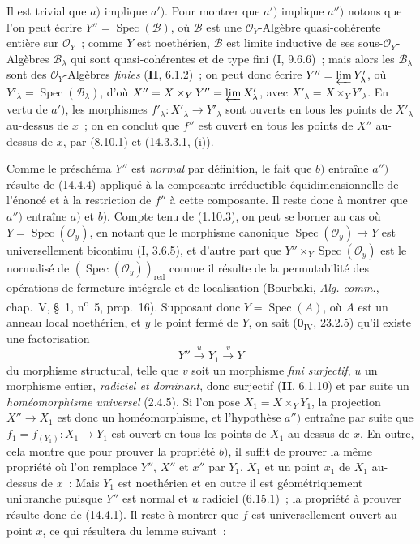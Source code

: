 Il est trivial que $a)$ implique $a')$. Pour montrer que $a')$ implique $a'')$
notons que l'on peut écrire $Y''=\operatorname{Spec}(\mathcal B)$, où $\mathcal B$
est une $\mathcal O_Y$-Algèbre quasi-cohérente entière sur $\mathcal O_Y$~; comme
$Y$ est noethérien, $\mathcal B$ est limite inductive de ses sous-$\mathcal O_Y$-
Algèbres $\mathcal B_\lambda$ qui sont quasi-cohérentes et de type fini (I, 9.6.6)~;
mais alors les $\mathcal B_\lambda$ sont des $\mathcal O_Y$-Algèbres \emph{finies}
(\textbf{II}, 6.1.2)~; on peut donc écrire
$Y''=\varprojlim Y'_\lambda$, où
$Y'_\lambda=\operatorname{Spec}(\mathcal B_\lambda)$, d'où
$X''=X\times_Y Y''=\varprojlim X'_\lambda$, avec
$X'_\lambda=X\times_Y Y'_\lambda$. En vertu de $a')$, les morphismes
$f'_\lambda:X'_\lambda\to Y'_\lambda$ sont ouverts en tous les points de
$X'_\lambda$ au-dessus de $x$~; on en conclut que $f''$ est ouvert en tous les
points de $X''$ au-dessus de $x$, par (8.10.1) et (14.3.3.1, (i)).

Comme le préschéma $Y''$ est \emph{normal} par définition, le fait que $b)$ entraîne
$a'')$ résulte de (14.4.4) appliqué à la composante irréductible
équidimensionnelle de l'énoncé et à la restriction de $f''$ à cette composante. Il
reste donc à montrer que $a'')$ entraîne $a)$ et $b)$. Compte tenu de (1.10.3), on
peut se borner au cas où $Y=\operatorname{Spec}(\mathcal O_y)$, en notant que le
morphisme canonique $\operatorname{Spec}(\mathcal O_y)\to Y$ est universellement
bicontinu (I, 3.6.5), et d'autre part que
$Y''\times_Y\operatorname{Spec}(\mathcal O_y)$ est le normalisé de
$(\operatorname{Spec}(\mathcal O_y))_{\mathrm{red}}$ comme il résulte de la
permutabilité des opérations de fermeture intégrale et de localisation (Bourbaki,
\emph{Alg. comm.}, chap.~V, \S~1, n\textsuperscript{o}~5, prop.~16). Supposant donc
$Y=\operatorname{Spec}(A)$, où $A$ est un anneau local noethérien, et $y$ le point
fermé de $Y$, on sait ($\mathbf{0}_{\mathrm{IV}}$, 23.2.5) qu'il existe une
factorisation
\[
  Y''\xrightarrow{u}Y_1\xrightarrow{v}Y
\]
du morphisme structural, telle que $v$ soit un morphisme \emph{fini surjectif}, $u$
un morphisme entier, \emph{radiciel et dominant}, donc surjectif (\textbf{II},
6.1.10) et par suite un \emph{homéomorphisme universel} (2.4.5). Si l'on pose
$X_1=X\times_Y Y_1$, la projection $X''\to X_1$ est donc un homéomorphisme, et
l'hypothèse $a'')$ entraîne par suite que $f_1=f_{(Y_1)}:X_1\to Y_1$ est ouvert en
tous les points de $X_1$ au-dessus de $x$. En outre, cela montre que pour prouver
la propriété $b)$, il suffit de prouver la même propriété où l'on remplace $Y''$,
$X''$ et $x''$ par $Y_1$, $X_1$ et un point $x_1$ de $X_1$ au-dessus de $x$~: Mais
$Y_1$ est noethérien et en outre il est géométriquement unibranche puisque $Y''$
est normal et $u$ radiciel (6.15.1)~; la propriété à prouver résulte donc de
(14.4.1). Il reste à montrer que $f$ est universellement ouvert au point $x$, ce
qui résultera du lemme suivant~:

